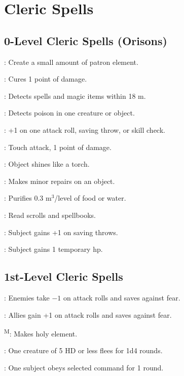 \section{Cleric Spells}



\subsection{0-Level Cleric Spells (Orisons)}

: Create a small amount of patron element.

: Cures 1 point of damage.

: Detects spells and magic items within 18 m.

: Detects poison in one creature or object.

: +1 on one attack roll, saving throw, or skill check.

: Touch attack, 1 point of damage.

: Object shines like a torch.

: Makes minor repairs on an object.

: Purifies 0.3 m$^3$/level of food or water.

: Read scrolls and spellbooks.

: Subject gains +1 on saving throws.

: Subject gains 1 temporary hp.



\subsection{1st-Level Cleric Spells}

: Enemies take $-1$ on attack rolls and saves against fear.

: Allies gain +1 on attack rolls and saves against fear.

\textsuperscript{M}: Makes holy element. %

: One creature of 5 HD or less flees for 1d4 rounds.

: One subject obeys selected command for 1 round.

